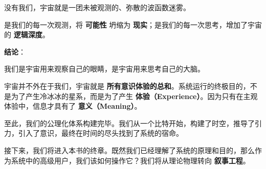 没有我们，宇宙就是一团未被观测的、弥散的波函数迷雾。

是我们的每一次观测，将 \textbf{可能性} 坍缩为 \textbf{现实}；是我们的每一次思考，增加了宇宙的 \textbf{逻辑深度}。

\textbf{结论}：

我们是宇宙用来观察自己的眼睛，是宇宙用来思考自己的大脑。

宇宙并不外在于我们，宇宙就是 \textbf{所有意识体验的总和}。系统运行的终极目的，不是为了产生冷冰冰的星系，而是为了产生 \textbf{体验（Experience）}。因为只有在主观体验中，信息才具有了 \textbf{意义（Meaning）}。

至此，我们的公理化体系构建完毕。我们从一个比特开始，构建了时空，推导了引力，引入了意识，最终在时间的尽头找到了系统的宿命。

接下来，我们将进入本书的终章。既然我们已经理解了系统的原理和目的，那么作为系统中的高级用户，我们该如何操作它？我们将从理论物理转向 \textbf{叙事工程}。
